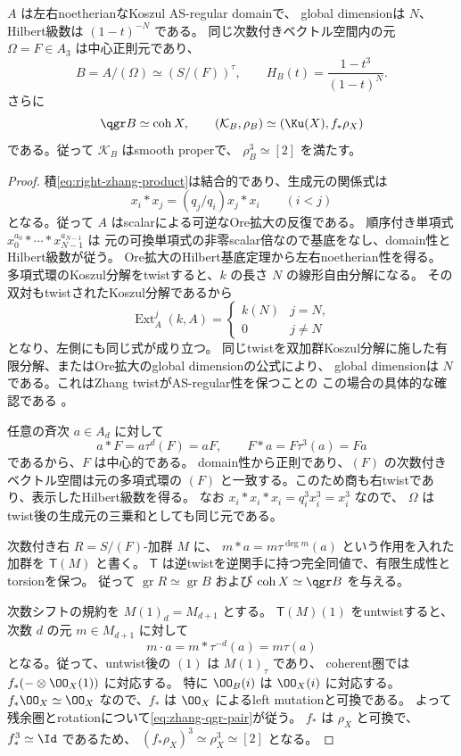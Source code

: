 \begin{lemma}\label{lem:zhang-cubic-structure}
 \(A\) は左右noetherianなKoszul AS-regular domainで、
 global dimensionは \(N\)、Hilbert級数は \((1-t)^{-N}\) である。
 同じ次数付きベクトル空間内の元 \(\Omega=F\in A_3\) は中心正則元であり、
 \[
 B=A/(\Omega)\simeq (S/(F))^{\tau},\qquad
 H_B(t)=\frac{1-t^3}{(1-t)^N}.
 \]
 さらに
 \begin{equation}\label{eq:zhang-qgr-pair}
 \qgr B\simeq\operatorname{coh}X,\qquad
 (\mathcal K_B,\rho_B)\simeq
 (\Ku(X),f_*\rho_X)
 \end{equation}
 である。従って \(\mathcal K_B\) はsmooth properで、
 \(\rho_B^3\simeq[2]\) を満たす。
\end{lemma}
\begin{proof}
 積\eqref{eq:right-zhang-product}は結合的であり、生成元の関係式は
 \[
 x_i*x_j=(q_j/q_i)x_j*x_i\qquad(i<j)
 \]
 となる。従って \(A\) はscalarによる可逆なOre拡大の反復である。
 順序付き単項式 \(x_0^{a_0}*\cdots*x_{N-1}^{a_{N-1}}\) は
 元の可換単項式の非零scalar倍なので基底をなし、domain性とHilbert級数が従う。
 Ore拡大のHilbert基底定理から左右noetherian性を得る。
 多項式環のKoszul分解をtwistすると、\(k\) の長さ \(N\) の線形自由分解になる。
 その双対もtwistされたKoszul分解であるから
 \[
 \operatorname{Ext}^j_A(k,A)=
 \begin{cases}k(N)&j=N,\\0&j\ne N\end{cases}
 \]
 となり、左側にも同じ式が成り立つ。
 同じtwistを双加群Koszul分解に施した有限分解、またはOre拡大のglobal dimensionの公式により、
 global dimensionは \(N\) である。これはZhang twistがAS-regular性を保つことの
 この場合の具体的な確認である \cite{ZhangTwist,RRZ}。

 任意の斉次 \(a\in A_d\) に対して
 \[
 a*F=a\tau^d(F)=aF,
 \qquad F*a=F\tau^3(a)=Fa
 \]
 であるから、\(F\) は中心的である。
 domain性から正則であり、\((F)\) の次数付きベクトル空間は元の多項式環の
 \((F)\) と一致する。このため商も右twistであり、表示したHilbert級数を得る。
 なお \(x_i*x_i*x_i=q_i^3x_i^3=x_i^3\) なので、
 \(\Omega\) はtwist後の生成元の三乗和としても同じ元である。

 次数付き右 \(R=S/(F)\)-加群 \(M\) に、
 \(m*a=m\tau^{\deg m}(a)\) という作用を入れた加群を \(\mathsf T(M)\) と書く。
 \(\mathsf T\) は逆twistを逆関手に持つ完全同値で、有限生成性とtorsionを保つ。
 従って \(\operatorname{gr}R\simeq\operatorname{gr}B\) および
 \(\operatorname{coh}X\simeq\qgr B\) を与える。

 次数シフトの規約を \(M(1)_d=M_{d+1}\) とする。
 \(\mathsf T(M)(1)\) をuntwistすると、次数 \(d\) の元 \(m\in M_{d+1}\) に対して
 \[
 m\cdot a=m*\tau^{-d}(a)=m\tau(a)
 \]
 となる。従って、untwist後の \((1)\) は \(M(1)_{\tau}\) であり、
 coherent圏では \(f_*(-\otimes\OO_X(1))\) に対応する。
 特に \(\OO_B(i)\) は \(\OO_X(i)\) に対応する。
 \(f_*\OO_X\simeq\OO_X\) なので、\(f_*\) は \(\OO_X\) によるleft mutationと可換である。
 よって残余圏とrotationについて\eqref{eq:zhang-qgr-pair}が従う。
 \(f_*\) は \(\rho_X\) と可換で、\(f_*^3\simeq\Id\) であるため、
 \((f_*\rho_X)^3\simeq\rho_X^3\simeq[2]\) となる。
\end{proof}

